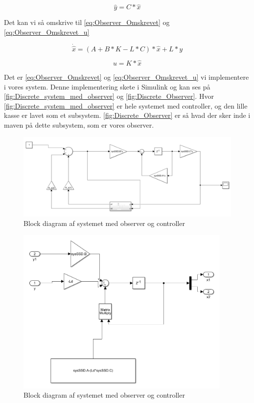 \begin{equation}
\hat{y} = C * \hat{x}
\label{eq:Observer_stateSpace_C_L}
\end{equation}

Det kan vi så omskrive til \autoref{eq:Observer_Omskrevet} og \autoref{eq:Observer_Omskrevet_u}

\begin{equation}
\dot{\hat{x}} = (A + B * K - L * C) * \hat{x} + L * y
\label{eq:Observer_Omskrevet}
\end{equation}

\begin{equation}
u =  K * \hat{x}
\label{eq:Observer_Omskrevet_u}
\end{equation}

Det er \autoref{eq:Observer_Omskrevet} og \autoref{eq:Observer_Omskrevet_u} vi implementere i vores system. Denne implementering skete i Simulink og kan ses på \autoref{fig:Discrete_system_med_observer} og \autoref{fig:Discrete_Observer}. Hvor \autoref{fig:Discrete_system_med_observer} er hele systemet med controller, og den lille kasse er lavet som et subsystem. \autoref{fig:Discrete_Observer} er så hvad der sker inde i maven på dette subsystem, som er vores observer.


\begin{figure}[H]
	\centering
	\includegraphics[width = 400pt]{Img/Discrete_system_med_observer.png}
	\caption{Block diagram af systemet med observer og controller}
	\label{fig:Discrete_system_med_observer}
\end{figure}

\begin{figure}[H]
	\centering
	\includegraphics[width = 300pt]{Img/Discrete_Observer.png}
	\caption{Block diagram af systemet med observer og controller}
	\label{fig:Discrete_Observer}
\end{figure}

